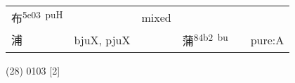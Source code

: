 \documentclass[14pt,a4paper]{scrartcl}
\begin{document}
\begin{longtable}[c]{@{}llllll@{}}
\begin{minipage}[t]{0.14\columnwidth}
布\textsuperscript{5e03~puH}
\strut\end{minipage} &
\begin{minipage}[t]{0.14\columnwidth}\raggedright\strut
\strut\end{minipage} &
\begin{minipage}[t]{0.14\columnwidth}\raggedright\strut
mixed
\strut\end{minipage}\tabularnewline
\begin{minipage}[t]{0.14\columnwidth}\raggedright\strut
浦
\strut\end{minipage} &
\begin{minipage}[t]{0.14\columnwidth}\raggedright\strut
bjuX, pjuX
\strut\end{minipage} &
\begin{minipage}[t]{0.14\columnwidth}\raggedright\strut
\strut\end{minipage} &
\begin{minipage}[t]{0.14\columnwidth}\raggedright\strut
蒲\textsuperscript{84b2~bu}
\strut\end{minipage} &
\begin{minipage}[t]{0.14\columnwidth}\raggedright\strut
\strut\end{minipage} &
\begin{minipage}[t]{0.14\columnwidth}\raggedright\strut
pure:A
\strut\end{minipage}\tabularnewline
\bottomrule
\end{longtable}

(28) 0103 {[}2{]}
\end{document}

